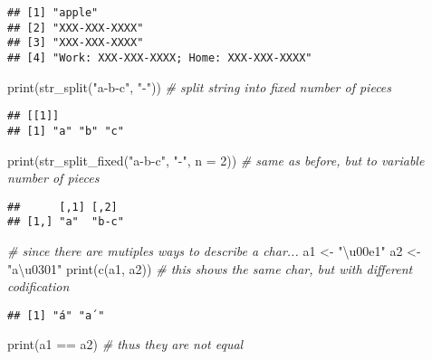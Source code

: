 \documentclass[
]{article}
\newenvironment{Shaded}{\begin{snugshade}}{\end{snugshade}}
\newcommand{\AttributeTok}[1]{\textcolor[rgb]{0.77,0.63,0.00}{#1}}
\newcommand{\CommentTok}[1]{\textcolor[rgb]{0.56,0.35,0.01}{\textit{#1}}}
\newcommand{\DecValTok}[1]{\textcolor[rgb]{0.00,0.00,0.81}{#1}}
\newcommand{\FunctionTok}[1]{\textcolor[rgb]{0.00,0.00,0.00}{#1}}
\newcommand{\NormalTok}[1]{#1}
\newcommand{\OtherTok}[1]{\textcolor[rgb]{0.56,0.35,0.01}{#1}}
\newcommand{\SpecialCharTok}[1]{\textcolor[rgb]{0.00,0.00,0.00}{#1}}
\newcommand{\StringTok}[1]{\textcolor[rgb]{0.31,0.60,0.02}{#1}}
\begin{document}
\begin{verbatim}
## [1] "apple"                                 
## [2] "XXX-XXX-XXXX"                          
## [3] "XXX-XXX-XXXX"                          
## [4] "Work: XXX-XXX-XXXX; Home: XXX-XXX-XXXX"
\end{verbatim}

\begin{Shaded}
\begin{Highlighting}[]
\FunctionTok{print}\NormalTok{(}\FunctionTok{str\_split}\NormalTok{(}\StringTok{"a{-}b{-}c"}\NormalTok{, }\StringTok{"{-}"}\NormalTok{)) }\CommentTok{\# split string into fixed number of pieces}
\end{Highlighting}
\end{Shaded}

\begin{verbatim}
## [[1]]
## [1] "a" "b" "c"
\end{verbatim}

\begin{Shaded}
\begin{Highlighting}[]
\FunctionTok{print}\NormalTok{(}\FunctionTok{str\_split\_fixed}\NormalTok{(}\StringTok{"a{-}b{-}c"}\NormalTok{, }\StringTok{"{-}"}\NormalTok{, }\AttributeTok{n =} \DecValTok{2}\NormalTok{)) }\CommentTok{\# same as before, but to variable number of pieces}
\end{Highlighting}
\end{Shaded}

\begin{verbatim}
##      [,1] [,2] 
## [1,] "a"  "b-c"
\end{verbatim}

\begin{Shaded}
\begin{Highlighting}[]
\CommentTok{\# since there are mutiples ways to describe a char...}
\NormalTok{a1 }\OtherTok{\textless{}{-}} \StringTok{"\textbackslash{}u00e1"}
\NormalTok{a2 }\OtherTok{\textless{}{-}} \StringTok{"a\textbackslash{}u0301"}
\FunctionTok{print}\NormalTok{(}\FunctionTok{c}\NormalTok{(a1, a2)) }\CommentTok{\# this shows the same char, but with different codification}
\end{Highlighting}
\end{Shaded}

\begin{verbatim}
## [1] "á" "a´"
\end{verbatim}

\begin{Shaded}
\begin{Highlighting}[]
\FunctionTok{print}\NormalTok{(a1 }\SpecialCharTok{==}\NormalTok{ a2) }\CommentTok{\# thus they are not equal}
\end{Highlighting}
\end{Shaded}
\end{document}
